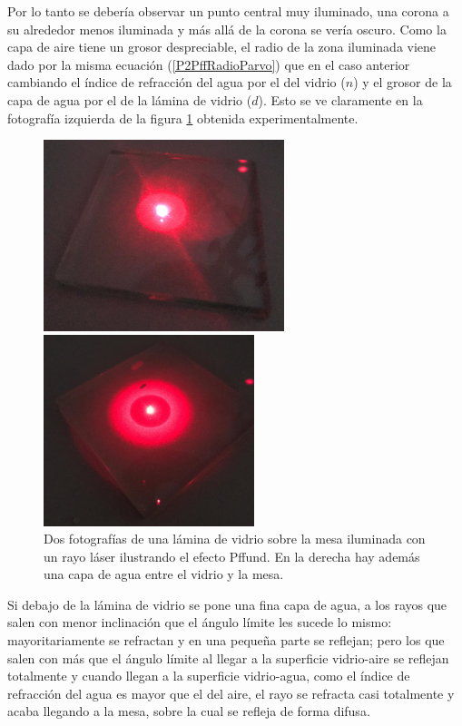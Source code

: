 \documentclass[12pt]{article}
\numberwithin{table}{section}
\numberwithin{figure}{section}
\numberwithin{equation}{section}
\begin{document}
Por lo tanto se debería observar un punto central muy iluminado, una corona a su alrededor menos iluminada y más allá de la corona se vería oscuro. Como la capa de aire tiene un grosor despreciable, el radio de la zona iluminada viene dado por la misma ecuación (\ref{P2PffRadioParvo}) que en el caso anterior cambiando el índice de refracción del agua por el del vidrio ($n$) y el grosor de la capa de agua por el de la lámina de vidrio ($d$). Esto se ve claramente en la fotografía izquierda de la figura \ref{P2PffFotoVidrio} obtenida experimentalmente.

\begin{figure}[!ht]
	\small \centering \sffamily
	\begin{center}
		\begin{minipage}{0.45\textwidth}
			\includegraphics[width=7cm]{P2PffVidrio.jpeg}
		\end{minipage}
		\begin{minipage}{0.45\textwidth}
			\includegraphics[width=6.15cm]{P2PffAgrio.jpeg}
		\end{minipage}
		\caption{Dos fotografías de una lámina de vidrio sobre la mesa iluminada con un rayo láser ilustrando el efecto Pffund. En la derecha hay además una capa de agua entre el vidrio y la mesa.}
		\label{P2PffFotoVidrio}
	\end{center}
\end{figure}

Si debajo de la lámina de vidrio se pone una fina capa de agua, a los rayos que salen con menor inclinación que el ángulo límite les sucede lo mismo: mayoritariamente se refractan y en una pequeña parte se reflejan; pero los que salen con más que el ángulo límite al llegar a la superficie vidrio-aire se reflejan totalmente y cuando llegan a la superficie vidrio-agua, como el índice de refracción del agua es mayor que el del aire, el rayo se refracta casi totalmente y acaba llegando a la mesa, sobre la cual se refleja de forma difusa.
\end{document}
